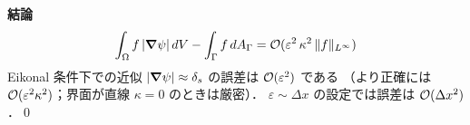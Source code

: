 \noindent\textbf{結論}
\[
  \int_\Omega f\,|\bm{\nabla}\psi|\,dV - \int_\Gamma f\,dA_\Gamma
  = \mathcal{O}(\varepsilon^2\,\kappa^2\,\|f\|_{L^\infty})
\]
Eikonal 条件下での近似 $|\bm{\nabla}\psi| \approx \delta_s$ の誤差は $\mathcal{O}(\varepsilon^2)$ である
（より正確には $\mathcal{O}(\varepsilon^2\kappa^2)$；界面が直線 $\kappa=0$ のときは厳密）．
$\varepsilon \sim \Delta x$ の設定では誤差は $\mathcal{O}(\Delta x^2)$．\qed

